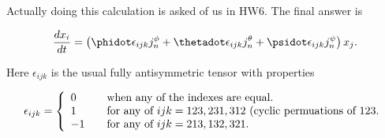 Actually doing this calculation is asked of us in HW6.  The final answer is

\begin{equation}\label{eqn:classicalMechanicsEulerAngles:440}
\frac{d x_i}{dt} = \left(
\phidot \epsilon_{ijk} j_n^\phi
+\thetadot \epsilon_{ijk} j_n^\theta
+\psidot \epsilon_{ijk} j_n^\psi
\right) x_j.
\end{equation}

Here $\epsilon_{ijk}$ is the usual fully antisymmetric tensor with properties

\begin{equation}\label{eqn:classicalMechanicsEulerAngles:460}
\epsilon_{ijk} =
\left\{
\begin{array}{l l}
0 & \quad \mbox{when any of the indexes are equal.} \\
1 & \quad \mbox{for any of $ijk = 123, 231, 312$ (cyclic permuations of $123$.} \\
-1 & \quad \mbox{for any of $ijk = 213, 132, 321$.} \\
\end{array}
\right.
\end{equation}

\EndNoBibArticle
